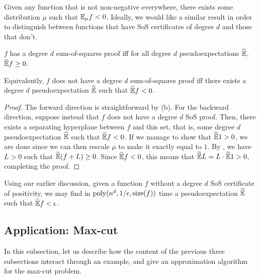 	Given any function that is not non-negative everywhere, there exists some distribution $\mu$ such that $\mathbb{E}_\mu f < 0$. Ideally, we would like a similar result in order to distinguish between functions that have SoS certificates of degree $d$ and those that don't.

	\begin{ftheo}
		\label{theo: sos-pe-equiv}
		$f$ has a degree $d$ sum-of-squares proof iff for all degree $d$ pseudoexpectations $\widetilde{\mathbb{E}}$, $\widetilde{\mathbb{E}} f \ge 0$.
	\end{ftheo}
	Equivalently, $f$ does not have a degree $d$ sum-of-squares proof iff there exists a degree $d$ pseudoexpectation $\widetilde{\mathbb{E}}$ such that $\widetilde{\mathbb{E}} f < 0$.
	\begin{proof}
		The forward direction is straightforward by (b). For the backward direction, suppose instead that $f$ does not have a degree $d$ SoS proof. Then, there exists a separating hyperplane between $f$ and this set, that is, some degree $d$ pseudoexpectation $\widetilde{\mathbb{E}}$ such that $\widetilde{\mathbb{E}} f < 0$. If we manage to show that $\widetilde{\mathbb{E}} 1 > 0$, we are done since we can then rescale $\mu$ to make it exactly equal to $1$. By , we have $L > 0$ such that $\widetilde{\mathbb{E}} (f+L) \ge 0$. Since $\widetilde{\mathbb{E}} f < 0$, this means that $\widetilde{\mathbb{E}} L = L \cdot \widetilde{\mathbb{E}} 1 > 0$, completing the proof.
	\end{proof}

	Using our earlier discussion, given a function $f$ without a degree $d$ SoS certificate of positivity, we may find in $\operatorname{poly}(n^d,1/\epsilon,\operatorname{size}(f))$ time a pseudoexpectation $\widetilde{\mathbb{E}}$ such that $\widetilde{\mathbb{E}} f < \epsilon$.

\subsection{Application: Max-cut}

	In this subsection, let us describe how the content of the previous three subsections interact through an example, and give an approximation algorithm for the max-cut problem.


